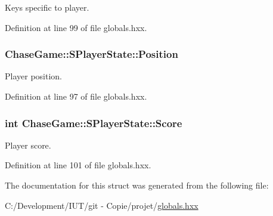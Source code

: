 Keys specific to player. 



Definition at line 99 of file globals.\-hxx.

\hypertarget{struct_chase_game_1_1_s_player_state_a0a68b95a4255f2a543675f88b00847b4}{
\subsubsection[{Position}]{ Chase\-Game\-::\-S\-Player\-State\-::\-Position}}\label{struct_chase_game_1_1_s_player_state_a0a68b95a4255f2a543675f88b00847b4}


Player position. 



Definition at line 97 of file globals.\-hxx.

\hypertarget{struct_chase_game_1_1_s_player_state_ac59e6b76a6e5303dbeef6a6b4fbca95d}{
\subsubsection[{Score}]{\setlength{\rightskip}{0pt plus 5cm}int Chase\-Game\-::\-S\-Player\-State\-::\-Score}}\label{struct_chase_game_1_1_s_player_state_ac59e6b76a6e5303dbeef6a6b4fbca95d}


Player score. 



Definition at line 101 of file globals.\-hxx.



The documentation for this struct was generated from the following file\-:\begin{DoxyCompactItemize}
\item 
C\-:/\-Development/\-I\-U\-T/git -\/ Copie/projet/\hyperlink{globals_8hxx}{globals.\-hxx}\end{DoxyCompactItemize}
